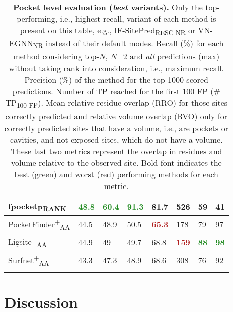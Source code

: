 \begin{landscape}
\begin{longtable}[c]{|M{33mm}|M{27mm}|M{29mm}|M{24mm}|M{27mm}|M{21mm}|M{19mm}|M{19mm}|}
fpocket\textsubscript{PRANK}       & \textbf{\textcolor{forestgreen}{48.8}}           & \textbf{\textcolor{forestgreen}{60.4}} & \textbf{\textcolor{forestgreen}{91.3}}         & 81.7           & 526         & 59     & 41     \\ \hline
PocketFinder\textsuperscript{+}\textsubscript{AA}    & 44.5           & 48.9             & 50.5         & \textbf{\textcolor{firebrick}{65.3}}           & 178         & 79     & 97     \\ \hline
Ligsite\textsuperscript{+}\textsubscript{AA}         & 44.9           & 49               & 49.7         & 68.8           & \textbf{\textcolor{firebrick}{159}}         & \textbf{\textcolor{forestgreen}{88}}     & \textbf{\textcolor{forestgreen}{98}}     \\ \hline
Surfnet\textsuperscript{+}\textsubscript{AA}         & 43.3           & 47.3             & 48.9         & 68.6           & 308         & 76     & 92     \\ \hline
\caption[Pocket level evaluation (\textit{best} variants)]{\textbf{Pocket level evaluation (\textit{best} variants).} Only the top-performing, i.e., highest recall, variant of each method is present on this table, e.g., IF-SitePred\textsubscript{RESC-NR} or VN-EGNN\textsubscript{NR}  instead of their default modes. Recall (\%) for each method considering top-$N$, $N$+2 and \textit{all} predictions (max) without taking rank into consideration, i.e., maximum recall. Precision (\%) of the method for the top-1000 scored predictions. Number of TP reached for the first 100 FP (\# TP\textsubscript{100 FP}). Mean relative residue overlap (RRO) for those sites correctly predicted and relative volume overlap (RVO) only for correctly predicted sites that have a volume, i.e., are pockets or cavities, and not exposed sites, which do not have a volume. These last two metrics represent the overlap in residues and volume relative to the observed site. Bold font indicates the best (green) and worst (red) performing methods for each metric.}
\label{tab:pocket_level_benchmark_variants}\\
\end{longtable}
\end{landscape}

\section{Discussion}

